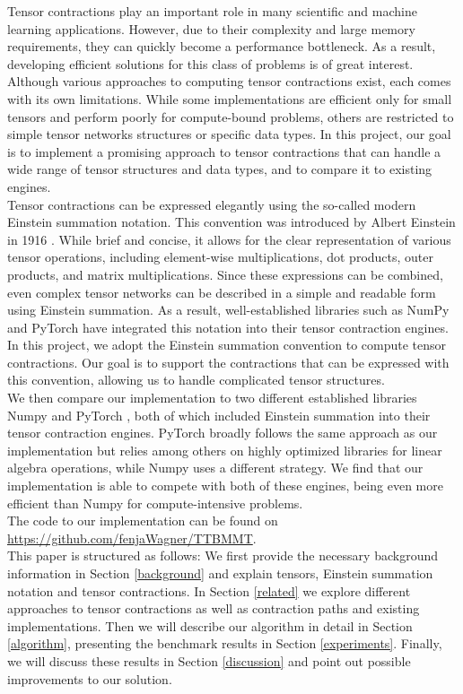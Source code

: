 Tensor contractions play an important role in many scientific and machine learning applications. However, due to their complexity and large memory requirements, they can quickly become a performance bottleneck. 
As a result, developing efficient solutions for this class of problems is of great interest. \\
Although various approaches to computing tensor contractions exist, each comes with its own limitations. While some implementations are efficient only for small tensors and perform poorly for compute-bound problems, others are restricted to simple tensor networks structures or specific data types. In this project, our goal is to implement a promising approach to tensor contractions that can handle a wide range of tensor structures and data types, and to compare it to existing engines.\\

\noindent Tensor contractions can be expressed elegantly using the so-called modern Einstein summation notation. This convention was introduced by Albert Einstein in 1916 \cite{einstein}. While brief and concise, it allows for the clear representation of various tensor operations, including element-wise multiplications, dot products, outer products, and matrix multiplications. Since these expressions can be combined, even complex tensor networks can be described in a simple and readable form using Einstein summation. As a result, well-established libraries such as NumPy \cite{Numpy} and PyTorch \cite{PyTorch} have integrated this notation into their tensor contraction engines. In this project, we adopt the Einstein summation convention to compute tensor contractions. Our goal is to support the contractions that can be expressed with this convention, allowing us to handle complicated tensor structures.\\

\noindent We then compare our implementation to two different established libraries Numpy \cite{Numpy} and PyTorch \cite{PyTorch}, both of which included Einstein summation into their tensor contraction engines. PyTorch broadly follows the same approach as our implementation but relies among others on highly optimized libraries for linear algebra operations, while Numpy uses a different strategy. We find that our implementation is able to compete with both of these engines, being even more efficient than Numpy for compute-intensive problems. \\
 The code to our implementation can be found on \url{https://github.com/fenjaWagner/TTBMMT}.\\
 
 \noindent This paper is structured as follows: We first provide the necessary background information in Section \ref{background} and explain tensors, Einstein summation notation and tensor contractions. In Section \ref{related} we explore different approaches to tensor contractions as well as contraction paths and existing implementations. Then we will describe our algorithm in detail in Section \ref{algorithm}, presenting the benchmark results in Section \ref{experiments}. Finally, we will discuss these results in Section \ref{discussion} and point out possible improvements to our solution.
